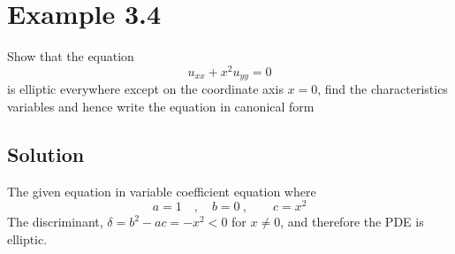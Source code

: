 \documentclass[11pt]{report}
\newcommand{\sps}{\\[0.2cm]}
\begin{document}
	\section*{Example 3.4}
	Show that the equation
	\begin{equation*}
		u_{xx} + x^2u_{yy} = 0 \label{ex:3_4_1} 
	\end{equation*}
	is elliptic everywhere except on the coordinate axis $x=0$, find the characteristics variables and hence write the equation in canonical form
	
	\subsection*{Solution}
	The given equation in variable coefficient equation where
	\begin{equation*}
		a=1\quad, \quad b=0~, \qquad c=x^2\label{ex:3_4_2}
	\end{equation*}
	The discriminant, $\delta = b^2 - ac = -x^2 < 0$ for $x\neq 0$, and therefore the PDE is elliptic.\sps
	
\end{document}
